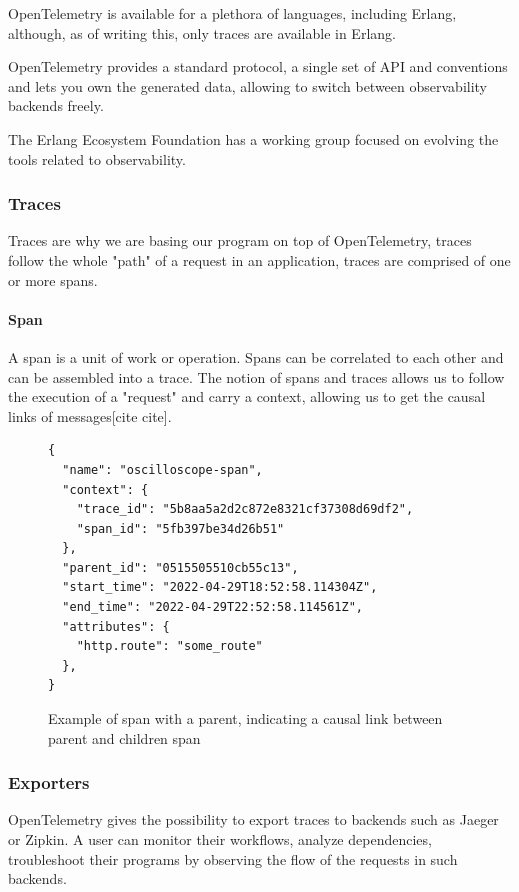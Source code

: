     OpenTelemetry is available for a plethora of languages, including Erlang, although, as of writing this, only traces are available in Erlang. 
    
    OpenTelemetry provides a standard protocol, a single set of API and conventions and lets you own the generated data, allowing to switch between observability backends freely.
    
    The Erlang Ecosystem Foundation has a working group focused on evolving the tools related to observability. 
    \subsubsection{Traces}
        Traces are why we are basing our program on top of OpenTelemetry, traces follow the whole "path" of a request in an application, traces are comprised of one or more spans.
        \paragraph{Span} A span is a unit  of work or operation. Spans can be correlated to each other and can be assembled into a trace.
    The notion of spans and traces allows us to follow the execution of a "request" and carry a context, allowing us to get the causal links of messages[cite cite]. %

\begin{figure}[H]
    \begin{verbatim} 
{
  "name": "oscilloscope-span",
  "context": {
    "trace_id": "5b8aa5a2d2c872e8321cf37308d69df2",
    "span_id": "5fb397be34d26b51"
  },
  "parent_id": "0515505510cb55c13",
  "start_time": "2022-04-29T18:52:58.114304Z",
  "end_time": "2022-04-29T22:52:58.114561Z",
  "attributes": {
    "http.route": "some_route"
  },
}
    \end{verbatim}
\caption{Example of span with a parent, indicating a causal link between parent and children span}
\end{figure}

    \subsubsection{Exporters}
            OpenTelemetry gives the possibility to export traces to backends such as Jaeger or Zipkin. A user can monitor their workflows, analyze dependencies, troubleshoot their programs by observing the flow of the requests in such backends. %

